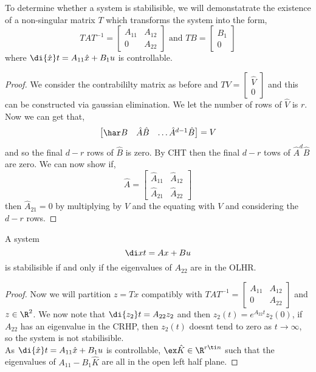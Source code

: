 To determine whether a system is stabilisible, we will demonstatrate the existence of a non-singular matrix $T$ which transforms the system into the form,
$$ TAT^{-1} = \begin{bmatrix}
  A_{11} & A_{12} \\ 0 & A_{22}
\end{bmatrix}  \text{ and } TB = \begin{bmatrix}
  B_1 \\ 0
\end{bmatrix}$$
where $\di {\hat x} t = A_{11}\hat x + B_1 u$ is controllable.

\begin{proof}
  We consider the contrabililty matrix as before and $TV = \begin{bmatrix}
    \hat V \\ 0
  \end{bmatrix}$ and this can be constructed via gaussian elimination. We let the number of rows of $\hat V$ is $r$. Now we can get that,
  $$ \begin{bmatrix}
    \har B & \hat A\hat B & \dots \hat A^{d-1}\hat B
  \end{bmatrix} = V$$
  and so the final $d - r$ rows of $\hat B$ is zero. By CHT then the final $d - r$ tows of $\hat A^d \hat B$ are zero. We can now show if,
  $$ \hat A = \begin{bmatrix}
    \hat A_{11} & \hat A_{12}\\
    \hat A_{21} & \hat A_{22}
  \end{bmatrix} $$
  then $\hat A_{21} = 0$ by multiplying by $V$ and the equating with $V$ and considering the $d - r$ rows.
\end{proof}

\begin{nthm}
  A system
  $$ \di x t = Ax + Bu $$
  is stabilisible if and only if the eigenvalues of $A_{22}$ are in the OLHR.
\end{nthm}
\begin{proof}
  Now we will partition $z = Tx$ compatibly with $TAT^{-1} = \begin{bmatrix}
    A_{11} & A_{12} \\
    0 & A_{22}
  \end{bmatrix}$ and $z \in \R^2$. We now note that $\di {z_2} t = A_{22}z_2$ and then $z_2(t) = e^{A_{22}t}z_2(0)$, if $A_{22}$ has an eigenvalue in the CRHP, then $z_2(t)$ doesnt tend to zero as $t \to \infty$, so the system is not stabilisible.\\

  As $\di {\hat{x}} t = A_{11}\hat x + B_1u$ is controllable, $\ex \hat K \in \R^{r \ti n}$ such that the eigenvalues of $A_{11} - B_1\hat K$ are all in the open left half plane. 
\end{proof}
